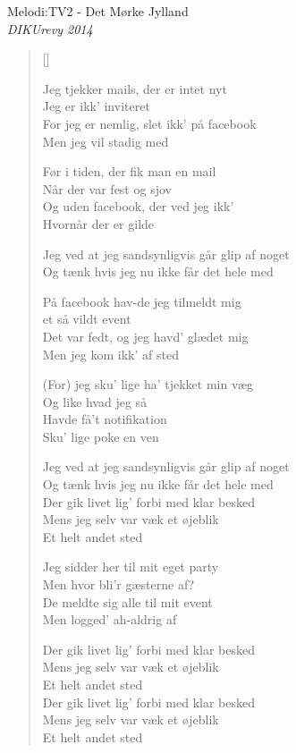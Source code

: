 {Melodi:TV2 - Det Mørke Jylland}\\[.2em]
{\small\itshape DIKUrevy 2014}
\begin{multicols}{2}
\settowidth{\versewidth}{Jeg ved at jeg sandsynligvis går glip af noget}
\begin{verse}[\versewidth]

Jeg tjekker mails, der er intet nyt\\
Jeg er ikk' inviteret\\
For jeg er nemlig, slet ikk' på facebook \\
Men jeg vil stadig med


Før i tiden, der fik man en mail\\
Når der var fest og sjov\\
Og uden facebook, der ved jeg ikk'\\
Hvornår der er gilde


Jeg ved at jeg sandsynligvis går glip af noget\\
Og tænk hvis jeg nu ikke får det hele med


På facebook hav-de jeg tilmeldt mig\\
et så vildt event\\
Det var fedt, og jeg havd' glædet mig\\
Men jeg kom ikk' af sted


(For) jeg sku' lige ha' tjekket min væg\\
Og like hvad jeg så\\
Havde få't notifikation\\
Sku' lige poke en ven


Jeg ved at jeg sandsynligvis går glip af noget\\
Og tænk hvis jeg nu ikke får det hele med\\
Der gik livet lig' forbi med klar besked\\
Mens jeg selv var væk et øjeblik\\
Et helt andet sted



Jeg sidder her til mit eget party\\
Men hvor bli'r gæsterne af?\\
De meldte sig alle til mit event\\
Men logged' ah-aldrig af



Der gik livet lig' forbi med klar besked\\
Mens jeg selv var væk et øjeblik\\
Et helt andet sted\\
Der gik livet lig' forbi med klar besked\\
Mens jeg selv var væk et øjeblik\\
Et helt andet sted
\end{verse}
\end{multicols}

